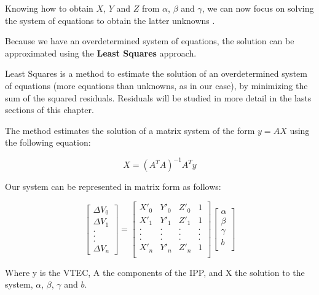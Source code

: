 Knowing how to obtain $X$, $Y$ and $Z$ from $\alpha$, $\beta$ and $\gamma$, we can now focus on solving the system of equations to obtain the latter unknowns .

Because we have an overdetermined system of equations, the solution can be approximated using the \textbf{Least Squares} approach. 

Least Squares is a method to estimate the solution of an overdetermined system of equations (more equations than unknowns, as in our case), by minimizing the sum of the squared residuals. Residuals will be studied in more detail in the lasts sections of this chapter.

The method estimates the solution of a matrix system of the form $y = AX$ using the following equation:

\begin{equation}\label{eq:mainEq}
X = (A^{T}A)^{-1}A^{T}y
\end{equation} 

Our system can be represented in matrix form  as follows:

\begin{equation} \label{eq:matrixSystem}
\begin{bmatrix}
\Delta V_{0} \\
\Delta V_{1} \\
. \\
. \\
. \\
\Delta V_{n}
\end{bmatrix}
=
\begin{bmatrix}
X'_{0} & Y'_{0} & Z'_{0} & 1 \\
X'_{1} & Y'_{1} & Z'_{1} & 1 \\
. & . & . & .\\
. & . & . & .\\
. & . & . & .\\
X'_{n} & Y'_{n} & Z'_{n} & 1 \\
\end{bmatrix}
\begin{bmatrix}
\alpha \\
\beta \\
\gamma \\
b \\
\end{bmatrix}
\end{equation}

Where y is the VTEC, A the components of the IPP, and X the solution to the system, $\alpha$, $\beta$, $\gamma$ and $b$.

